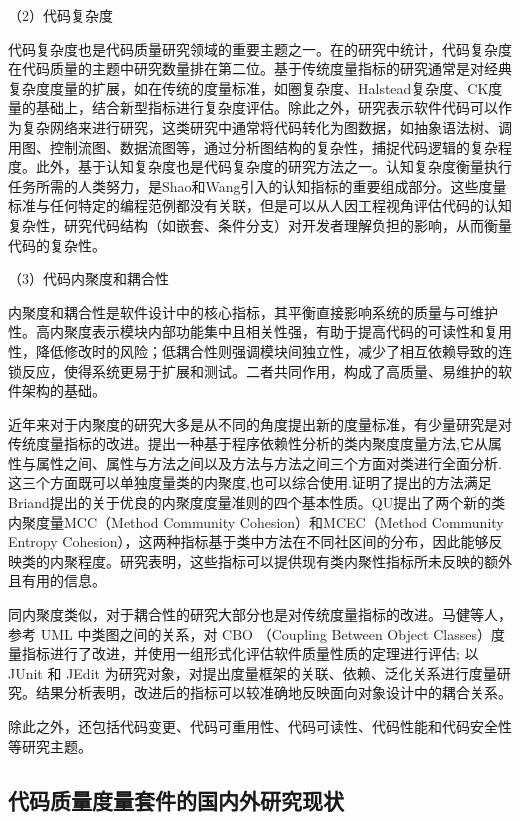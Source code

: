 （2）代码复杂度

代码复杂度也是代码质量研究领域的重要主题之一。在\cite{NUNEZVARELA2017164}的研究中统计，代码复杂度在代码质量的主题中研究数量排在第二位。基于传统度量指标的研究通常是对经典复杂度度量的扩展，如在传统的度量标准，如圈复杂度、Halstead复杂度、CK度量的基础上，结合新型指标进行复杂度评估。除此之外，研究表示软件代码可以作为复杂网络来进行研究\cite{2015Exploring, 2012A}，这类研究中通常将代码转化为图数据，如抽象语法树、调用图、控制流图、数据流图等，通过分析图结构的复杂性，捕捉代码逻辑的复杂程度。此外，基于认知复杂度也是代码复杂度的研究方法之一。认知复杂度衡量执行任务所需的人类努力\cite{2012Framework, 2012Asuite}，是Shao和Wang\cite{2010Assessing}引入的认知指标的重要组成部分。这些度量标准与任何特定的编程范例都没有关联，但是可以从人因工程视角评估代码的认知复杂性，研究代码结构（如嵌套、条件分支）对开发者理解负担的影响，从而衡量代码的复杂性。


（3）代码内聚度和耦合性

内聚度和耦合性是软件设计中的核心指标，其平衡直接影响系统的质量与可维护性。高内聚度表示模块内部功能集中且相关性强，有助于提高代码的可读性和复用性，降低修改时的风险；低耦合性则强调模块间独立性，减少了相互依赖导致的连锁反应，使得系统更易于扩展和测试。二者共同作用，构成了高质量、易维护的软件架构的基础。

近年来对于内聚度的研究大多是从不同的角度提出新的度量标准，有少量研究是对传统度量指标的改进。\cite{陈振强2003}提出一种基于程序依赖性分析的类内聚度度量方法,它从属性与属性之间、属性与方法之间以及方法与方法之间三个方面对类进行全面分析.这三个方面既可以单独度量类的内聚度,也可以综合使用.证明了提出的方法满足Briand提出的关于优良的内聚度度量准则的四个基本性质。QU\cite{QU2015193}提出了两个新的类内聚度量MCC（Method Community Cohesion）和MCEC（Method Community Entropy Cohesion），这两种指标基于类中方法在不同社区间的分布，因此能够反映类的内聚程度。研究表明，这些指标可以提供现有类内聚性指标所未反映的额外且有用的信息。

同内聚度类似，对于耦合性的研究大部分也是对传统度量指标的改进。马健等人\cite{马健2018}，参考 UML 中类图之间的关系，对 CBO （Coupling Between Object Classes）度量指标进行了改进，并使用一组形式化评估软件质量性质的定理进行评估; 以 JUnit 和 JEdit 为研究对象，对提出度量框架的关联、依赖、泛化关系进行度量研究。结果分析表明，改进后的指标可以较准确地反映面向对象设计中的耦合关系。


除此之外，还包括代码变更、代码可重用性、代码可读性、代码性能和代码安全性等研究主题。

\subsection{代码质量度量套件的国内外研究现状}

